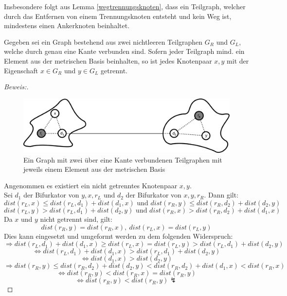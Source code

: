 \begin{bem}
Insbesondere folgt aus Lemma \ref{wegtrennungsknoten}, dass ein Teilgraph, welcher durch das Entfernen von einem Trennungsknoten entsteht und kein Weg ist, mindestens einen Ankerknoten beinhaltet.
\end{bem}
\begin{lem}
\label{second_theorem}
Gegeben sei ein Graph bestehend aus zwei nichtleeren Teilgraphen $G_R$ und $G_L$, welche durch genau eine Kante verbunden sind. Sofern jeder Teilgraph mind. ein Element aus der metrischen Basis beinhalten, so ist jedes Knotenpaar $x,y$ mit der Eigenschaft $x \in G_R$ und $y \in G_L$ getrennt.
\end{lem}
\begin{proof}[Beweis:] ~
\begin{figure}[h!]
		\centering 		 
  \includegraphics[width=420pt]{bilder/bew5.pdf}
	\caption{Ein Graph mit zwei über eine Kante verbundenen Teilgraphen mit jeweils einem Element aus der metrischen Basis}
  	 \end{figure}
  Angenommen es existiert ein nicht getrenntes Knotenpaar $x,y$.\\Sei $d_1$ der Bifurkator von $y,x,r_L$ und $d_2$ der Bifurkator von $x,y,r_R$. Dann gilt: $$dist(r_L,x) \leq dist(r_L,d_1)+ dist(d_1,x)\text{ und }dist(r_R,y) \leq dist(r_R,d_2)+ dist(d_2,y)$$ $$dist(r_L,y) > dist(r_L,d_1)+ dist(d_2,y)\text{ und }dist(r_R,x) > dist(r_R,d_2)+ dist(d_1,x)$$
  Da $x$ und $y$ nicht getrennt sind, gilt:
   $$dist(r_R,y) =dist(r_R,x),\: dist(r_L,x) = dist(r_L,y)$$ Dies kann eingesetzt und umgeformt werden zu dem folgenden Widerspruch:
  $$\Rightarrow dist(r_L,d_1)+ dist(d_1,x) \geq dist(r_L,x) = dist(r_L,y)> dist(r_L,d_1)+ dist(d_2,y)$$
  $$\Leftrightarrow dist(r_L,d_1)+ dist(d_1,x) > dist(r_L,d_1)+ dist(d_2,y)$$
  $$\Leftrightarrow dist(d_1,x) >  dist(d_2,y)$$
  $$\Rightarrow dist(r_R,y) \leq dist(r_R,d_2)+ dist(d_2,y) < dist(r_R,d_2) + dist(d_1,x) < dist(r_R,x)$$
  $$\Leftrightarrow dist(r_R,y) < dist(r_R,x) = dist(r_R,y)$$
  $$\Leftrightarrow dist(r_R,y) < dist(r_R,y) \lightning $$  
  \end{proof}
